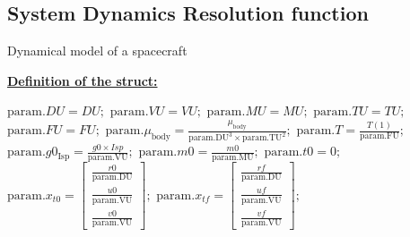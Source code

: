 \documentclass{article}
\begin{document}
	\newpage
	\subsection{System Dynamics Resolution function}	
	\begin{algorithm}[H]
		\caption{Dynamical model of a spacecraft}
		\label{alg:dynamical_model}
		\begin{algorithmic}
			\State \textbf{\underline{Definition of the struct:}}
			\begin{algorithmic}
				\State $\text{param}.DU = DU;$
				\State $\text{param}.VU = VU;$
				\State $\text{param}.MU = MU;$
				\State $\text{param}.TU = TU;$
				\State $\text{param}.FU = FU;$
				\State $\text{param}.\mu_{\text{body}} = \frac{\mu_{\text{body}}}{\text{param.DU}^3 \times \text{param.TU}^2};$
				\State $\text{param}.T = \frac{T(1)}{\text{param.FU}};$
				\State $\text{param}.g0_{\text{Isp}} = \frac{g0 \times Isp}{\text{param.VU}};$
				\State $\text{param}.m0 = \frac{m0}{\text{param.MU}};$
				\State $\text{param}.t0 = 0;$
				\State $\text{param}.x_{t0} = \begin{bmatrix} \frac{r0}{\text{param.DU}} \\ \frac{u0}{\text{param.VU}} \\ \frac{v0}{\text{param.VU}} \end{bmatrix};$
				\State $\text{param}.x_{tf} = \begin{bmatrix} \frac{rf}{\text{param.DU}} \\ \frac{uf}{\text{param.VU}} \\ \frac{vf}{\text{param.VU}} \end{bmatrix};$
			\end{algorithmic}
			
		\end{algorithmic}
	\end{algorithm}
	
\end{document}
